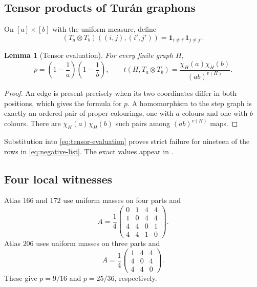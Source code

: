 \documentclass[11pt]{article}
\numberwithin{equation}{section}
\newtheorem{lemma}[theorem]{Lemma}
\theoremstyle{definition}
\theoremstyle{remark}
\newcommand{\one}{\mathbf 1}
\begin{document}
\subsection{Tensor products of Tur\'{a}n graphons}

On $[a]\times[b]$ with the uniform measure, define
\begin{equation}
 (T_a\otimes T_b)((i,j),(i',j'))
 =\one_{i\ne i'}\one_{j\ne j'}.
 \label{eq:tensor-turan}
\end{equation}

\begin{lemma}[Tensor evaluation]
\label{lem:tensor-evaluation}
For every finite graph $H$,
\begin{equation}
 p=\left(1-\frac1a\right)\left(1-\frac1b\right),
 \qquad
 t(H,T_a\otimes T_b)=
 \frac{\chi_H(a)\chi_H(b)}{(ab)^{v(H)}}.
 \label{eq:tensor-evaluation}
\end{equation}
\end{lemma}

\begin{proof}
An edge is present precisely when its two coordinates differ in both
positions, which gives the formula for $p$.  A homomorphism to the step graph
is exactly an ordered pair of proper colourings, one with $a$ colours and one
with $b$ colours.  There are $\chi_H(a)\chi_H(b)$ such pairs among
$(ab)^{v(H)}$ maps.
\end{proof}

Substitution into \eqref{eq:tensor-evaluation} proves strict failure for
nineteen of the rows in \eqref{eq:negative-list}.  The exact values appear in
.

\subsection{Four local witnesses}

Atlas $166$ and $172$ use uniform masses on four parts and
\begin{equation}
 A=\frac14
 \begin{pmatrix}
 0&1&4&4\\1&0&4&4\\4&4&0&1\\4&4&1&0
 \end{pmatrix}.
 \label{eq:two-scale-matrix}
\end{equation}
Atlas $206$ uses uniform masses on three parts and
\begin{equation}
 A=\frac14
 \begin{pmatrix}
 1&4&4\\4&0&4\\4&4&0
 \end{pmatrix}.
 \label{eq:one-diagonal-matrix}
\end{equation}
These give $p=9/16$ and $p=25/36$, respectively.
\end{document}

